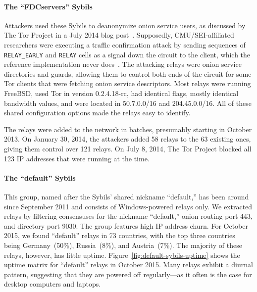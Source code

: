 \paragraph{The ``FDCservers'' Sybils}
Attackers used these Sybils to deanonymize onion service users, as discussed by
The Tor Project in a July 2014 blog post~\cite{cmucert}.  Supposedly,
CMU/SEI-affiliated researchers were executing a traffic confirmation attack by
sending sequences of \texttt{RELAY\_EARLY} and \texttt{RELAY} cells as a signal
down the circuit to the client, which the reference implementation never
does~\cite{cmucert,cmucert2}.  The attacking relays were onion service
directories and guards, allowing them to control both ends of the circuit for
some Tor clients that were fetching onion service descriptors.  Most relays
were running FreeBSD, used Tor in version 0.2.4.18-rc, had identical flags,
mostly identical bandwidth values, and were located in 50.7.0.0/16 and
204.45.0.0/16.  All of these shared configuration options made the relays easy
to identify.

The relays were added to the network in batches, presumably starting in October
2013.  On January 30, 2014, the attackers added 58 relays to the 63 existing
ones, giving them control over 121 relays.  On July 8, 2014, The Tor Project
blocked all 123 IP addresses that were running at the time.

\paragraph{The ``default'' Sybils}
This group, named after the Sybils' shared nickname ``default,'' has been around
since September 2011 and consists of Windows-powered relays only.  We extracted
relays by filtering consensuses for the nickname ``default,'' onion routing port
443, and directory port 9030.  The group features high IP address churn.  For
October 2015, we found ``default'' relays in 73 countries, with the top three
countries being Germany~(50\%), Russia~(8\%), and Austria~(7\%).  The majority
of these relays, however, has little uptime.
Figure~\ref{fig:default-sybils-uptime} shows the uptime matrix for ``default''
relays in October 2015.  Many relays exhibit a diurnal pattern, suggesting that
they are powered off regularly---as it often is the case for desktop computers
and laptops.

